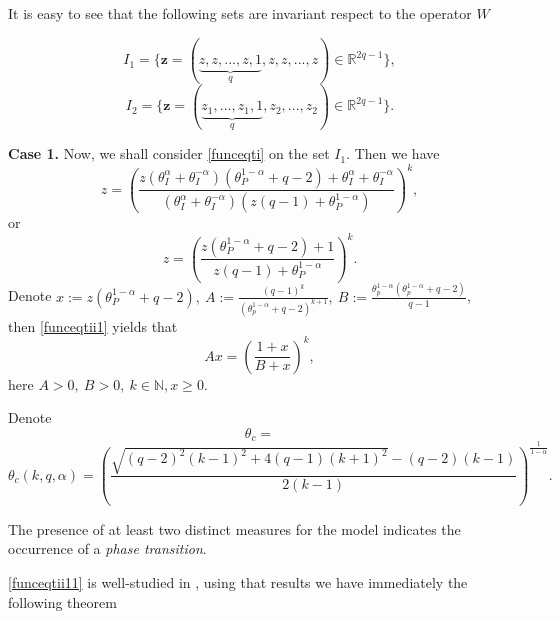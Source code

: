\documentclass[sn-mathphys]{sn-jnl}%
\theoremstyle{thmstyleone}%
\theoremstyle{thmstyletwo}%
\theoremstyle{thmstylethree}%
\begin{document}
It is easy to see that the following sets are invariant respect to the operator $W$

$$I_1=\{\textbf{z}=(\underbrace{z,z,...,z,1}_q,z,z,...,z)\in\mathbb R^{2q-1}\},$$
$$I_2=\{\textbf{z}=(\underbrace{z_1,...,z_1,1}_q,z_2,...,z_2)\in\mathbb R^{2q-1}\}.$$

\textbf{Case 1.}  Now, we shall consider \eqref{funceqti} on the set $I_1$. Then we have
\begin{equation}\label{funceqtii1}
z=\left(\frac{z(\theta_{I}^{\alpha }+\theta_{I}^{-\alpha })(\theta_{P}^{1-\alpha}+q-2)+\theta_I^{\alpha }+\theta_I^{-\alpha }}{(\theta_{I}^{\alpha }+\theta_{I}^{-\alpha })\left(z(q-1)+\theta_{P}^{1-\alpha}\right)}\right)^k,
\end{equation}
or
\begin{equation}\label{funceqtii1}
z=\left(\frac{z(\theta_{P}^{1-\alpha}+q-2)+1}{z(q-1)+\theta_{P}^{1-\alpha}}\right)^k.
\end{equation}
Denote $x:=z(\theta_P^{1-\alpha}+q-2),\ A:=\frac{(q-1)^k}{\left(\theta_p^{1-\alpha}+q-2\right)^{k+1}},\ B:=\frac{\theta_p^{1-\alpha}(\theta_p^{1-\alpha}+q-2)}{q-1}$,\\ then \eqref{funceqtii1} yields that
\begin{equation}\label{funceqtii11}
Ax=\left(\frac{1+x}{B+x}\right)^k,
\end{equation}
here $A>0,\ B>0,\ k\in \mathbb N, x\geq0$.

Denote $$\theta_c=$$$$\theta_c(k,q,\alpha)=\left(\frac{\sqrt{(q-2)^2(k-1)^2+4(q-1)(k+1)^2}-(q-2)(k-1)}{2(k-1)}\right)^{\frac{1}{1-\alpha}}.$$

The presence of at least two distinct measures for the model indicates the occurrence of a \emph{phase transition}.

\eqref{funceqtii11} is well-studied in \cite{Preston}, using that results we have immediately the following theorem
\end{document}
